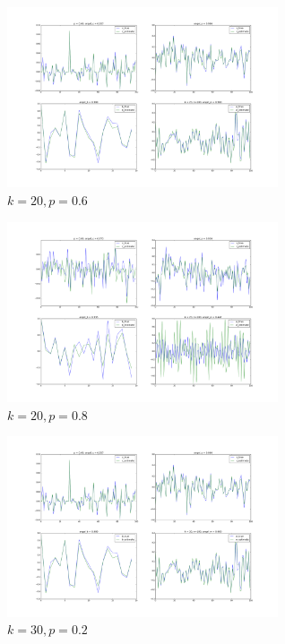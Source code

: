 \documentclass[letter, 10pt]{article}
\numberwithin{equation}{section}
\begin{document}
\begin{figure}
\centering 
\label{fig:4}
\includegraphics[width=8cm,keepaspectratio]{fig2/bShort_k_lenKnown_xSparse_w_Gaus_AGauss_n100_k20_p0_60_sigma0_00.png}
\caption{$k=20, p=0.6$}
\end{figure}

\begin{figure}
\centering 
\label{fig:5}
\includegraphics[width=8cm,keepaspectratio]{fig2/bShort_k_lenKnown_xSparse_w_Gaus_AGauss_n100_k20_p0_80_sigma0_00.png}
\caption{$k=20, p=0.8$}
\end{figure}

\begin{figure}
\centering 
\label{fig:6}
\includegraphics[width=8cm,keepaspectratio]{fig2/bShort_k_lenKnown_xSparse_w_Gaus_AGauss_n100_k20_p0_60_sigma0_00.png}
\caption{$k=30, p=0.2$}
\end{figure}
\end{document}
